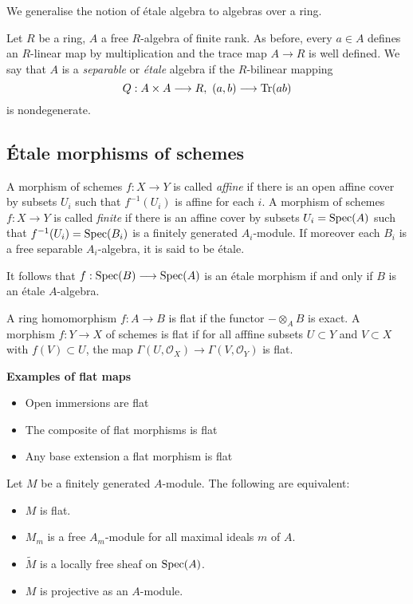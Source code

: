 We generalise the notion of \'etale algebra to algebras over a ring.

\begin{definition}
  Let $R$ be a ring, $A$ a free $R$-algebra of finite rank. As before, every $a \in A$ defines an $R$-linear map by multiplication and the trace map $A \to R$ is well defined. We say that $A$ is a \textit{separable} or \textit{\'etale} algebra if the $R$-bilinear mapping 
  \[
    Q : A \times A \longrightarrow R,\ (a,b) \longrightarrow \operatorname{Tr}(ab)
  \]
  is nondegenerate.
\end{definition}

\subsection{\'Etale morphisms of schemes}
\begin{definition}
A morphism of schemes $f: X \to Y$ is called \textit{affine} if there is an open affine cover by subsets $U_i$ such that $f^{-1}(U_i)$ is affine for each $i$.  A morphism of schemes $f: X \to Y$ is called \textit{finite} if there is an affine cover by subsets $U_i = \operatorname{Spec}(A)$ such that $f^{-1}(U_i) = \operatorname{Spec}(B_i)$ is a finitely generated $A_i$-module.  If moreover each $B_i$ is a free separable $A_i$-algebra, it is said to be \'etale.
\end{definition}
It follows that $f: \operatorname{Spec}(B) \longrightarrow \operatorname{Spec}(A)$ is an \'etale morphism if and only if $B$ is an \'etale $A$-algebra.

\begin{definition}\label{def:flatness}
  A ring homomorphism $f: A \to B$ is flat if the functor $- \otimes_A B$ is exact. A morphism $f: Y \to X$ of schemes is flat if for all afffine subsets $U \subset Y$ and $V \subset X$ with $f(V) \subset U$, the map $\Gamma(U, \mathcal{O}_X) \to \Gamma(V, \mathcal{O}_Y)$ is flat.
\end{definition}

\textbf{Examples of flat maps}
  \begin{itemize}
    \item Open immersions are flat
    \item The composite of flat morphisms is flat
    \item Any base extension a flat morphism is flat
  \end{itemize}

\begin{theorem}
  Let $M$ be a finitely generated $A$-module. The following are equivalent:
  \begin{itemize}
    \item $M$ is flat.
    \item $M_m$ is a free $A_m$-module for all maximal ideals $m$ of $A$.
    \item $\widetilde{M}$ is a locally free sheaf on $\operatorname{Spec}(A)$.
    \item $M$ is projective as an $A$-module.
  \end{itemize}
\end{theorem}

